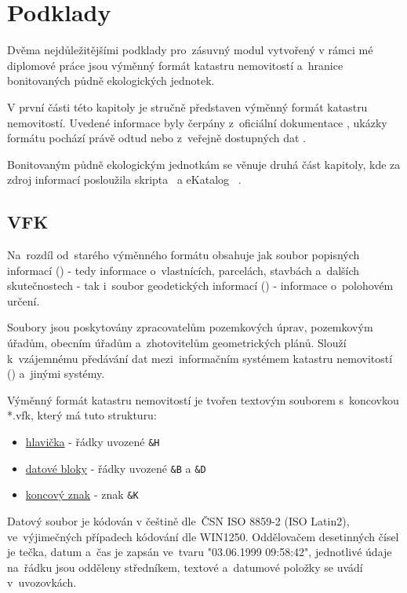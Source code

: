 \chapter{Podklady}
\label{podklady}

Dvěma nejdůležitějšími podklady pro~zásuvný modul vytvořený v rámci mé diplomové práce jsou výměnný formát katastru nemovitostí a~hranice bonitovaných půdně ekologických jednotek.

V první části této kapitoly je stručně představen výměnný formát katastru nemovitostí. Uvedené informace byly čerpány z~oficiální dokumentace \citep{struktura_vfk}, ukázky formátu pochází právě odtud nebo z~veřejně dostupných dat \citep{zdroj_vfk}.

Bonitovaným půdně ekologickým jednotkám se věnuje druhá část kapitoly, kde za zdroj informací posloužila skripta~\citep{pu_skripta} a eKatalog ~\citep{vumop_bpej}.

\section{VFK}
\label{vfk}

Na~rozdíl od~starého výměnného formátu obsahuje  jak soubor popisných informací () - tedy informace o~vlastnících, parcelách, stavbách a~dalších skutečnostech - tak i~soubor geodetických informací () - informace o~polohovém určení.

Soubory  jsou poskytovány zpracovatelům pozemkových úprav, pozemkovým úřadům, obecním úřadům a~zhotovitelům geometrických plánů. Slouží k~vzájemnému předávání dat mezi~informačním systémem katastru nemovitostí () a~jinými systémy.

Výměnný formát katastru nemovitostí je tvořen textovým souborem s~koncovkou *.vfk, který má tuto strukturu:
	\begin{itemize}[leftmargin=1.5cm, noitemsep]
		\item \underline{hlavička} - řádky uvozené \texttt{\&H}
		\item \underline{datové bloky} - řádky uvozené \texttt{\&B} a \texttt{\&D}
		\item \underline{koncový znak} - znak \texttt{\&K}
	\end{itemize}

Datový soubor je kódován v češtině dle~ČSN ISO 8859-2 (ISO Latin2), ve~výjimečných případech kódování dle
WIN1250. Oddělovačem desetinných čísel je tečka, datum a~čas je zapsán ve~tvaru "03.06.1999 09:58:42", jednotlivé údaje na~řádku jsou odděleny středníkem, textové a~datumové položky se uvádí v~uvozovkách.

